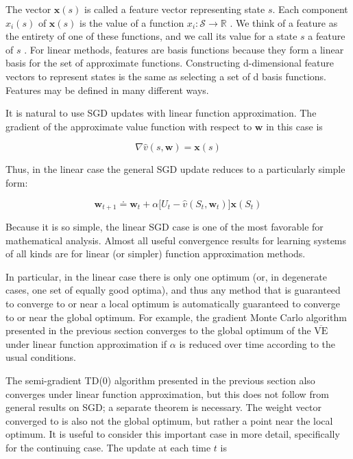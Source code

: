 \documentclass{article}
\begin{document}
The vector $\mathbf { x } ( s )$ is called a feature vector representing state $s$. Each component $x _ { i } ( s )$ of $\mathbf { x } ( s )$ is the value of a function $x _ { i } : \mathcal { S } \rightarrow \mathbb { R }$ . 
We think of a feature as the entirety of one of these functions, and we call its value for a state $s$ a feature of $s$ . For linear methods, features are basis functions because they form a linear basis for the set of approximate functions. 
Constructing d-dimensional feature vectors to represent states is the same as selecting a set of d basis functions. Features may be defined in many different ways.

It is natural to use SGD updates with linear function approximation. The gradient of the approximate value function with respect to $\mathbf { w }$ in this case is

$$
\nabla \hat { v } ( s \mathbf { , } \mathbf { w } ) = \mathbf { x } ( s )
$$

Thus, in the linear case the general SGD update reduces to a particularly simple form:

$$
\mathbf { w } _ { t + 1 } \doteq \mathbf { w } _ { t } + \alpha \Big [ U _ { t } - \hat { v } ( S _ { t } \mathbf { , } \mathbf { w } _ { t } ) \Big ] \mathbf { x } ( S _ { t } )
$$

Because it is so simple, the linear SGD case is one of the most favorable for mathematical analysis. Almost all useful convergence results for learning systems 
of all kinds are for linear (or simpler) function approximation methods.

In particular, in the linear case there is only one optimum (or, in degenerate cases, one set of equally good optima), and thus any method that is guaranteed to converge to or near a local optimum is automatically guaranteed to converge to or near the global optimum. 
For example, the gradient Monte Carlo algorithm presented in the previous section converges to the global optimum of the $\overline { { \mathrm { V E } } }$ under linear function approximation if $\alpha$ is reduced over time according to the usual conditions.

The semi-gradient TD(0) algorithm presented in the previous section also converges under linear function approximation, but this does not follow from general results on SGD; 
a separate theorem is necessary. The weight vector converged to is also not the global optimum, but rather a point near the local optimum. It is useful to consider this important case in more detail, 
specifically for the continuing case. The update at each time $t$ is
\end{document}

